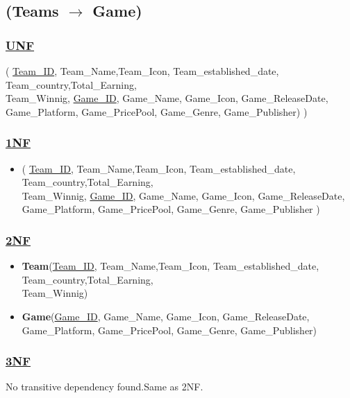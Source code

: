 \subsection{\texorpdfstring{\centering (Teams $\rightarrow$ Game)}{(Teams - Game)}}

\subsubsection*{\underline{UNF}}

(
\underline{Team\_ID}, Team\_Name,Team\_Icon, Team\_established\_date, Team\_country,Total\_Earning,\\Team\_Winnig,
\underline{Game\_ID}, Game\_Name, Game\_Icon, Game\_ReleaseDate, Game\_Platform, Game\_PricePool, Game\_Genre, Game\_Publisher)
)

\subsubsection*{\underline{1NF}}
\begin{itemize}
    \item (
          \underline{Team\_ID}, Team\_Name,Team\_Icon, Team\_established\_date, Team\_country,Total\_Earning,\\Team\_Winnig,
          \underline{Game\_ID}, Game\_Name, Game\_Icon, Game\_ReleaseDate, Game\_Platform, Game\_PricePool, Game\_Genre, Game\_Publisher
          )
\end{itemize}

\subsubsection*{\underline{2NF}}
\begin{itemize}
    \item \textbf{Team}(\underline{Team\_ID}, Team\_Name,Team\_Icon, Team\_established\_date, Team\_country,Total\_Earning,\\Team\_Winnig)
    \item \textbf{Game}(\underline{Game\_ID}, Game\_Name, Game\_Icon, Game\_ReleaseDate, Game\_Platform, Game\_PricePool, Game\_Genre, Game\_Publisher)
\end{itemize}

\subsubsection*{\underline{3NF}}
No transitive dependency found.Same as 2NF.

